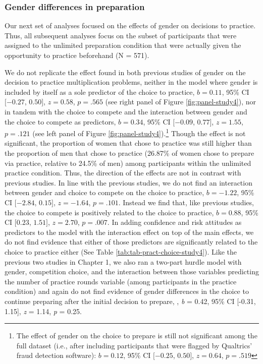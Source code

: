 \documentclass[letterpaper, nobind]{templates/ociamthesis}
\begin{document}
\hypertarget{gender-differences-in-preparation-3}{%
\subsubsection{Gender differences in preparation}\label{gender-differences-in-preparation-3}}

Our next set of analyses focused on the effects of gender on decisions to practice. Thus, all subsequent analyses focus on the subset of participants that were assigned to the unlimited preparation condition that were actually given the opportunity to practice beforehand (N = 571).

We do not replicate the effect found in both previous studies of gender on the decision to practice multiplication problems, neither in the model where gender is included by itself as a sole predictor of the choice to practice, \(b = 0.11\), 95\% CI \([-0.27\), \(0.50]\), \(z = 0.58\), \(p = .565\) (see right panel of Figure \ref{fig:panel-study4}), nor in tandem with the choice to compete and the interaction between gender and the choice to compete as predictors, \(b = 0.34\), 95\% CI \([-0.09\), \(0.77]\), \(z = 1.55\), \(p = .121\) (see left panel of Figure \ref{fig:panel-study4}).\footnote{The effect of gender on the choice to prepare is still not significant among the full dataset (i.e., after including participants that were flagged by Qualtrics' fraud detection software): \(b = 0.12\), 95\% CI \([-0.25\), \(0.50]\), \(z = 0.64\), \(p = .519\)} Though the effect is not significant, the proportion of women that chose to practice was still higher than the proportion of men that chose to practice (26.87\% of women chose to prepare via practice, relative to 24.5\% of men) among participants within the unlimited practice condition. Thus, the direction of the effects are not in contrast with previous studies. In line with the previous studies, we do not find an interaction between gender and choice to compete on the choice to practice, \(b = -1.22\), 95\% CI \([-2.84\), \(0.15]\), \(z = -1.64\), \(p = .101\). Instead we find that, like previous studies, the choice to compete is positively related to the choice to practice, \(b = 0.88\), 95\% CI \([0.23\), \(1.51]\), \(z = 2.70\), \(p = .007\). In adding confidence and risk attitudes as predictors to the model with the interaction effect on top of the main effects, we do not find evidence that either of those predictors are significantly related to the choice to practice either (See Table \ref{tab:tab-pract-choice-study4}). Like the previous two studies in Chapter 1, we also ran a two-part hurdle model with gender, competition choice, and the interaction between those variables predicting the number of practice rounds variable (among participants in the practice condition) and again do not find evidence of gender differences in the choice to continue preparing after the initial decision to prepare, , \emph{b} = 0.42, 95\% CI {[}-0.31, 1.15{]}, \emph{z} = 1.14, \emph{p} = 0.25.\\
\end{document}
